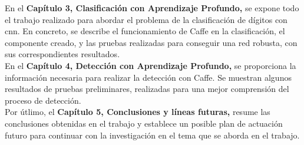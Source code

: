 En el \textbf{Capítulo 3, Clasificación con Aprendizaje Profundo,} se expone todo el trabajo realizado para abordar el problema de la clasificación de dígitos con \acrshort{cnn}. En concreto, se describe el funcionamiento de Caffe en la clasificación, el componente creado, y las pruebas realizadas para conseguir una red robusta, con sus correspondientes resultados.\\

En el \textbf{Capítulo 4, Detección con Aprendizaje Profundo,}  se proporciona la información necesaria para realizar la detección con Caffe. Se muestran algunos resultados de pruebas preliminares, realizadas para una mejor comprensión del proceso de detección.\\

Por útlimo, el \textbf{Capítulo 5, Conclusiones y líneas futuras,} resume las conclusiones obtenidas en el trabajo y establece un posible plan de actuación futuro para continuar con la investigación en el tema que se aborda en el trabajo.
